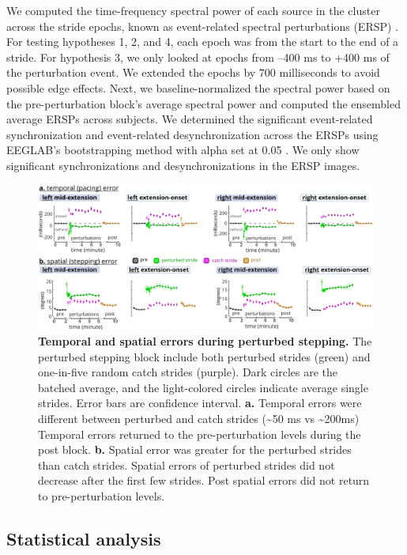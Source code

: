 \documentclass[shortpaper,twoside,web]{ieeecolor}
\newcommand{\td}{\textasciitilde}
\begin{document}
We computed the time-frequency spectral power of each source in the cluster across the stride epochs, known as event-related spectral perturbations (ERSP) \cite{Makeig1993-jx}. For testing hypotheses 1, 2, and 4, each epoch was from the start to the end of a stride. For hypothesis 3, we only looked at epochs from –400 ms to +400 ms of the perturbation event. We extended the epochs by 700 milliseconds to avoid possible edge effects. Next, we baseline-normalized the spectral power based on the pre-perturbation block's average spectral power and computed the ensembled average ERSPs across subjects. We determined the significant event-related synchronization and event-related desynchronization across the ERSPs using EEGLAB’s bootstrapping method with alpha set at 0.05 \cite{Pfurtscheller1999-oi}. We only show significant synchronizations and desynchronizations in the ERSP images.

\begin{figure}[!ht]
\centerline{\includegraphics{figures/04_error-result-r2.jpg}}
\caption{\textbf{Temporal and spatial errors during perturbed stepping.} The perturbed stepping block include both perturbed strides (green) and one-in-five random catch strides (purple). Dark circles are the batched average, and the light-colored circles indicate average single strides. Error bars are confidence interval. \textbf{a.} Temporal errors were different between perturbed and catch strides (\td50 ms vs \td200ms) Temporal errors returned to the pre-perturbation levels during the post block. \textbf{b.} Spatial error was greater for the perturbed strides than catch strides. Spatial errors of perturbed strides did not decrease after the first few strides. Post spatial errors did not return to pre-perturbation levels.}
\label{fig4}
\end{figure}

\subsection{Statistical analysis}
\end{document}
